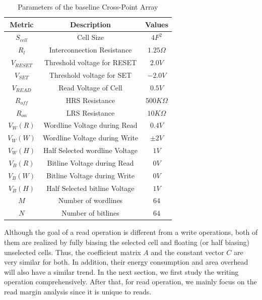\begin{table}[!b]
  \centering
  \scriptsize
    \scriptsize
  \caption{Parameters of the baseline Cross-Point Array}\label{table:parameter}
  \vspace{-5pt}
  \begin{tabular}{c|c|c}
    \hline    \hline
    \textbf{Metric} & \textbf{Description} & \textbf{Values} \\
    \hline
    \textbf{$S_{cell}$} & Cell Size & \textbf{$4F^2$} \\
    \textbf{$R_l$} &  Interconnection Resistance&\textbf{$1.25\Omega$} \\
    \textbf{$V_{RESET}$} & Threshold voltage for RESET&\textbf{$2.0V$} \\
    \textbf{$V_{SET}$} & Threshold voltage for SET&\textbf{$-2.0V$} \\
    \textbf{$V_{READ}$} & Read Voltage of Cell&\textbf{$0.5V$} \\
    \textbf{$R_{off}$} & HRS Resistance &\textbf{$500K\Omega$} \\
    \textbf{$R_{on}$} & LRS Resistance &\textbf{$10K\Omega$} \\
    \textbf{$V_{W}(R)$} & Wordline Voltage during Read &\textbf{$0.4V$} \\
    \textbf{$V_{W}(W)$} & Wordline Voltage during Write  &\textbf{$\pm2V$} \\
    \textbf{$V_{W}(H)$} & Half Selected wordline Voltage &\textbf{$1V$} \\
    \textbf{$V_{B}(R)$} & Bitline Voltage during Read  &\textbf{$0V$} \\
    \textbf{$V_{B}(W)$} & Bitline Voltage during Write  &\textbf{$0V$} \\
    \textbf{$V_{B}(H)$} & Half Selected bitline Voltage &\textbf{$1V$} \\
    \textbf{$M$} & Number of wordlines &\textbf{$64$} \\
    \textbf{$N$} & Number of bitlines &\textbf{$64$} \\
    \hline
  \end{tabular}
  \vspace{-10pt}
\end{table}

Although the goal of a read operation is different from a write operations, both of them are realized by fully biasing the selected cell and floating (or half biasing) unselected cells. Thus, the coefficient matrix $A$ and the constant vector $C$ are very similar for both. In addition, their energy consumption and area overhead will also have a similar trend. In the next section,  we first study the writing operation comprehensively.  After that, for read operation, we mainly focus on the read margin analysis since it is unique to reads.

